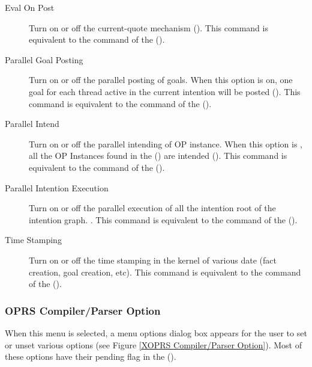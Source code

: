 \begin{description}

\item[Eval On Post] Turn on or off the current-quote mechanism
(). This command is equivalent to the  command of the \CPK{} ().

\item[Parallel Goal Posting] Turn on or off the parallel posting of goals. When
this option is on, one goal for each thread active in the current intention
will be posted (). This command is
equivalent to the  command of the \CPK{}
().

\item[Parallel Intend] Turn on or off the parallel intending of OP instance.
When this option is , all the OP Instances found in the
 () are intended
(). This command is equivalent to the  command of the \CPK{} (). 

\item[Parallel Intention Execution] Turn on or off the parallel execution of
all the intention root of the intention graph. . This command is equivalent to the  command of the \CPK{} ().

\item[Time Stamping] Turn on or off the time stamping in the kernel of various
date (fact creation, goal creation, etc). This command is equivalent to the
 command of the \CPK{} (). 

\end{description}

\subsubsection{OPRS Compiler/Parser Option}


When this menu is selected, a menu options dialog box appears for the user to
set or unset various options (see Figure \ref{XOPRS Compiler/Parser Option}). Most of these
options have their pending flag in the \CPK{} ().

